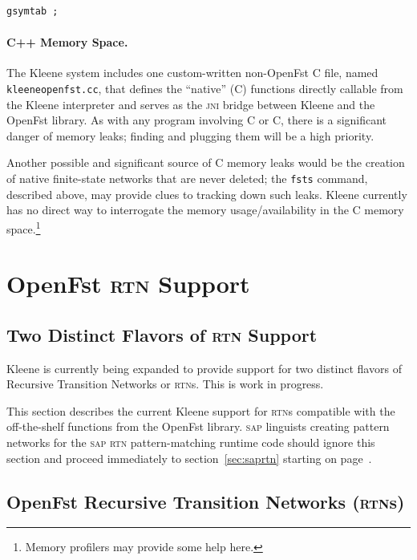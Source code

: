 \documentclass[letterpaper,12pt]{article}
\newcommand{\acro}{\textsc}
\def\CPP{{C\nolinebreak[4]\hspace{-.08em}\raisebox{.3ex}{\footnotesize\bf
+}\nolinebreak\hspace{-.1em}\raisebox{.3ex}{\footnotesize\bf +}}}
\begin{document}
\begin{Verbatim}[fontsize=\small]
gsymtab ;
\end{Verbatim}

\paragraph{C++ Memory Space.}

The Kleene system includes one custom-written non-OpenFst \CPP{} file,
named \texttt{kleeneopenfst.cc}, that defines the ``native'' (\CPP{})
functions directly callable from the Kleene interpreter and serves as the
\acro{jni} bridge between Kleene and the OpenFst library.  As with any
program involving C or \CPP{}, there is a significant danger of memory
leaks; finding and plugging them will be a high priority.

Another possible and significant source of \CPP{} memory leaks would be
the creation of native finite-state networks that are never deleted; the
\texttt{fsts} command, described above, may provide clues to tracking
down such leaks.  Kleene currently has no direct way to interrogate the
memory usage/availability in the \CPP{} memory space.\footnote{Memory
profilers may provide some help here.}

\section{OpenFst \acro{rtn} Support}

\label{sec:openfstrtn}

\subsection{Two Distinct Flavors of \acro{rtn} Support}

Kleene is currently being expanded to provide support for two distinct
flavors of Recursive Transition Networks or \acro{rtn}s.  This is work in
progress.

This section describes the current Kleene support for \acro{rtn}s
compatible with the off-the-shelf functions from the OpenFst library.
\acro{sap} linguists creating pattern networks for the \acro{sap}
\acro{rtn} pattern-matching runtime code should ignore this section and
proceed immediately to section~\ref{sec:saprtn} starting on
page~\pageref{sec:saprtn}.

\subsection{OpenFst Recursive Transition Networks (\acro{rtn}s)}
\end{document}
